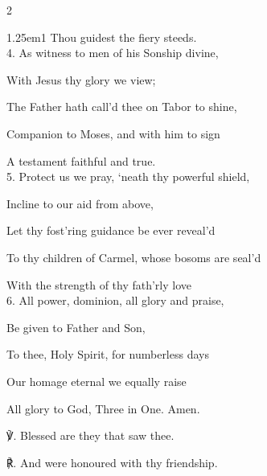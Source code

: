 \begin{paracol}{2}
\begin{hangparas}{1.25em}{1}
Thou guidest the fiery steeds.\\

4. As witness to men of his Sonship divine,

With Jesus thy glory we view;

The Father hath call'd thee on Tabor to shine,

Companion to Moses, and with him to sign

A testament faithful and true.\\

5. Protect us we pray, ‘neath thy powerful shield,

Incline to our aid from above,

Let thy fost'ring guidance be ever reveal'd

To thy children of Carmel, whose bosoms are seal'd

With the strength of thy fath'rly love\\

6. All power, dominion, all glory and praise,

Be given to Father and Son,

To thee, Holy Spirit, for numberless days

Our homage eternal we equally raise

All glory to God, Three in One. Amen.\\
\end{hangparas}

    ℣. Blessed are they that saw thee.

	℟. And were honoured with thy friendship.
	

\fussy
\end{paracol}

\mattins
{}

